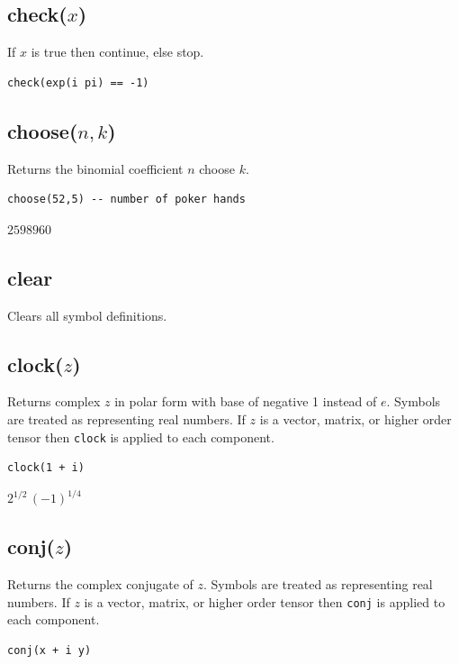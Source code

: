 \subsection*{check($x$)}

If $x$ is true then continue, else stop.

{\color{blue}
\begin{verbatim}
check(exp(i pi) == -1)
\end{verbatim}
}

\subsection*{choose($n,k$)}

Returns the binomial coefficient $n$ choose $k$.

{\color{blue}
\begin{verbatim}
choose(52,5) -- number of poker hands
\end{verbatim}
}

$2598960$

\subsection*{clear}

Clears all symbol definitions.

\subsection*{clock($z$)}

Returns complex $z$ in polar form with base of negative 1 instead of $e$.
Symbols are treated as representing real numbers.
If $z$ is a vector, matrix, or higher order tensor then
\verb$clock$ is applied to each component.

{\color{blue}
\begin{verbatim}
clock(1 + i)
\end{verbatim}
}

$2^{1/2}\,(-1)^{1/4}$

\subsection*{conj($z$)}

Returns the complex conjugate of $z$.
Symbols are treated as representing real numbers.
If $z$ is a vector, matrix, or higher order tensor then
\verb$conj$ is applied to each component.

{\color{blue}
\begin{verbatim}
conj(x + i y)
\end{verbatim}
}

